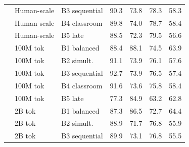 \documentclass[11pt]{article}
\begin{document}
\begin{table}[ht!]
\begin{minipage}[t]{0.49\linewidth}
\begin{tabular}{ll l cc cc}
 & Human-scale & B3 sequential & \cellcolor[rgb]{0.777,1.000,0.777} 90.3 & \cellcolor[rgb]{0.870,1.000,0.870} 73.8 & \cellcolor[rgb]{0.799,1.000,0.799} 78.3 & \cellcolor[rgb]{0.932,1.000,0.932} 58.3 \\
 & Human-scale & B4 classroom & \cellcolor[rgb]{0.780,1.000,0.780} 89.8 & \cellcolor[rgb]{0.869,1.000,0.869} 74.0 & \cellcolor[rgb]{0.796,1.000,0.796} 78.7 & \cellcolor[rgb]{0.931,1.000,0.931} 58.4 \\
 & Human-scale & B5 late & \cellcolor[rgb]{0.787,1.000,0.787} 88.5 & \cellcolor[rgb]{0.878,1.000,0.878} 72.3 & \cellcolor[rgb]{0.790,1.000,0.790} 79.5 & \cellcolor[rgb]{0.946,1.000,0.946} 56.6 \\
\addlinespace[1.5pt]
 & 100M tok & B1 balanced & \cellcolor[rgb]{0.788,1.000,0.788} 88.4 & \cellcolor[rgb]{0.792,1.000,0.792} 88.1 & \cellcolor[rgb]{0.826,1.000,0.826} 74.5 & \cellcolor[rgb]{0.886,1.000,0.886} 63.9 \\
 & 100M tok & B2 simult. & \cellcolor[rgb]{0.773,1.000,0.773} 91.1 & \cellcolor[rgb]{0.870,1.000,0.870} 73.9 & \cellcolor[rgb]{0.815,1.000,0.815} 76.1 & \cellcolor[rgb]{0.937,1.000,0.937} 57.6 \\
 & 100M tok & B3 sequential & \cellcolor[rgb]{0.764,1.000,0.764} 92.7 & \cellcolor[rgb]{0.870,1.000,0.870} 73.9 & \cellcolor[rgb]{0.812,1.000,0.812} 76.5 & \cellcolor[rgb]{0.939,1.000,0.939} 57.4 \\
 & 100M tok & B4 classroom & \cellcolor[rgb]{0.770,1.000,0.770} 91.6 & \cellcolor[rgb]{0.871,1.000,0.871} 73.6 & \cellcolor[rgb]{0.817,1.000,0.817} 75.8 & \cellcolor[rgb]{0.931,1.000,0.931} 58.4 \\
 & 100M tok & B5 late & \cellcolor[rgb]{0.849,1.000,0.849} 77.3 & \cellcolor[rgb]{0.810,1.000,0.810} 84.9 & \cellcolor[rgb]{0.906,1.000,0.906} 63.2 & \cellcolor[rgb]{0.895,1.000,0.895} 62.8 \\
\addlinespace[1.5pt]
 & 2B tok & B1 balanced & \cellcolor[rgb]{0.794,1.000,0.794} 87.3 & \cellcolor[rgb]{0.801,1.000,0.801} 86.5 & \cellcolor[rgb]{0.839,1.000,0.839} 72.7 & \cellcolor[rgb]{0.881,1.000,0.881} 64.4 \\
 & 2B tok & B2 simult. & \cellcolor[rgb]{0.785,1.000,0.785} 88.9 & \cellcolor[rgb]{0.882,1.000,0.882} 71.7 & \cellcolor[rgb]{0.810,1.000,0.810} 76.8 & \cellcolor[rgb]{0.951,1.000,0.951} 55.9 \\
 & 2B tok & B3 sequential & \cellcolor[rgb]{0.779,1.000,0.779} 89.9 & \cellcolor[rgb]{0.874,1.000,0.874} 73.1 & \cellcolor[rgb]{0.810,1.000,0.810} 76.8 & \cellcolor[rgb]{0.955,1.000,0.955} 55.5 \\

\end{tabular}
\end{minipage}
\end{table}
\end{document}
